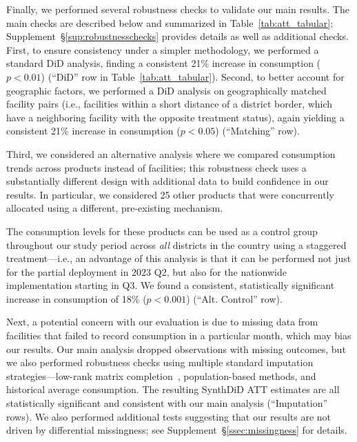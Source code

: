 \documentclass[12pt]{article}
\begin{document}
Finally, we performed several robustness checks to validate our main results. The main checks are described below and summarized in Table~\ref{tab:att_tabular}; Supplement~\S\ref{sup:robustnesschecks} provides details as well as additional checks.  First, to ensure consistency under a simpler methodology, we performed a standard DiD analysis, finding a consistent 21\% increase in consumption ($p<0.01$) (``DiD'' row in Table~\ref{tab:att_tabular}). Second, to better account for geographic factors, we performed a DiD analysis on geographically matched facility pairs (i.e., facilities within a short distance of a district border, which have a neighboring facility with the opposite treatment status), again yielding a consistent 21\% increase in consumption ($p<0.05$) (``Matching'' row).

Third, we considered an alternative analysis where we compared consumption trends across products instead of facilities; this robustness check uses a substantially different design with additional data to build confidence in our results. In particular, we considered 25 other products that were concurrently allocated using a different, pre-existing mechanism.

The consumption levels for these products can be used as a control group throughout our study period across \textit{all} districts in the country using a staggered treatment---i.e., an advantage of this analysis is that it can be performed not just for the partial deployment in 2023 Q2, but also for the nationwide implementation starting in Q3. We found a consistent, statistically significant increase in consumption of 18\% ($p<0.001$) (``Alt. Control'' row).

Next, a potential concern with our evaluation is due to missing data from facilities that failed to record consumption in a particular month, which may bias our results. Our main analysis dropped observations with missing outcomes, but we also performed robustness checks using multiple standard imputation strategies---low-rank matrix completion~\cite{candes2012exact}, population-based methods, and historical average consumption. The resulting SynthDiD ATT estimates are all statistically significant and consistent with our main analysis (``Imputation'' rows). We also performed additional tests suggesting that our results are not driven by differential missingness; see Supplement~\S\ref{ssec:missingness} for details.
\end{document}
